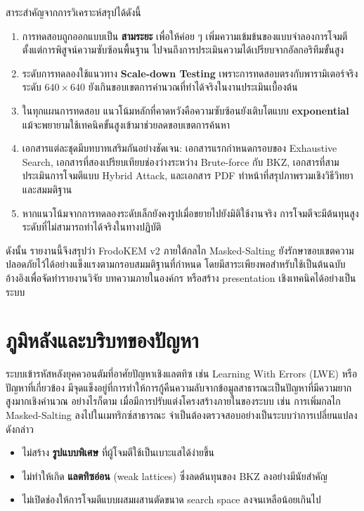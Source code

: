 \documentclass[12pt,a4paper]{article}
\newcommand{\term}[1]{\textbf{#1}}
\newcommand{\eng}[1]{\textenglish{#1}}
\begin{document}
	สาระสำคัญจากการวิเคราะห์สรุปได้ดังนี้
	\begin{enumerate}[label=\arabic*.]
		\item การทดสอบถูกออกแบบเป็น \term{สามระยะ} เพื่อให้ค่อย ๆ เพิ่มความเข้มข้นของแบบจำลองการโจมตี ตั้งแต่การพิสูจน์ความซับซ้อนพื้นฐาน ไปจนถึงการประเมินความได้เปรียบจากอัลกอริทึมขั้นสูง
		\item ระดับการทดลองใช้แนวทาง \term{Scale-down Testing} เพราะการทดสอบตรงกับพารามิเตอร์จริงระดับ $640\times640$ ยังเกินขอบเขตการคำนวณที่ทำได้จริงในงานประเมินเบื้องต้น
		\item ในทุกแผนการทดสอบ แนวโน้มหลักที่คาดหวังคือความซับซ้อนยังเติบโตแบบ \term{exponential} แม้จะพยายามใช้เทคนิคขั้นสูงเข้ามาช่วยลดขอบเขตการค้นหา
		\item เอกสารแต่ละชุดมีบทบาทเสริมกันอย่างชัดเจน: เอกสารแรกกำหนดกรอบของ \eng{Exhaustive Search}, เอกสารที่สองเปรียบเทียบช่องว่างระหว่าง \eng{Brute-force} กับ \eng{BKZ}, เอกสารที่สามประเมินการโจมตีแบบ \eng{Hybrid Attack}, และเอกสาร \eng{PDF} ทำหน้าที่สรุปภาพรวมเชิงวิธีวิทยาและสมมติฐาน
		\item หากแนวโน้มจากการทดลองระดับเล็กยังคงรูปเมื่อขยายไปยังมิติใช้งานจริง การโจมตีจะมีต้นทุนสูงระดับที่ไม่สามารถทำได้จริงในทางปฏิบัติ
	\end{enumerate}
	
	ดังนั้น รายงานนี้จึงสรุปว่า \eng{FrodoKEM v2} ภายใต้กลไก \eng{Masked-Salting} ยังรักษาขอบเขตความปลอดภัยไว้ได้อย่างแข็งแรงตามกรอบสมมติฐานที่กำหนด โดยมีสาระเพียงพอสำหรับใช้เป็นต้นฉบับอ้างอิงเพื่อจัดทำรายงานวิจัย บทความภายในองค์กร หรือสร้าง \eng{presentation} เชิงเทคนิคได้อย่างเป็นระบบ
	
	\section{ภูมิหลังและบริบทของปัญหา}
	
	ระบบเข้ารหัสหลังยุคควอนตัมที่อาศัยปัญหาเชิงแลตทิซ เช่น \eng{Learning With Errors (LWE)} หรือปัญหาที่เกี่ยวข้อง มีจุดแข็งอยู่ที่การทำให้การกู้คืนความลับจากข้อมูลสาธารณะเป็นปัญหาที่มีความยากสูงมากเชิงคำนวณ อย่างไรก็ตาม เมื่อมีการปรับแต่งโครงสร้างภายในของระบบ เช่น การเพิ่มกลไก \eng{Masked-Salting} ลงไปในเมทริกซ์สาธารณะ จำเป็นต้องตรวจสอบอย่างเป็นระบบว่าการเปลี่ยนแปลงดังกล่าว
	\begin{itemize}
		\item ไม่สร้าง \term{รูปแบบพิเศษ} ที่ผู้โจมตีใช้เป็นเบาะแสได้ง่ายขึ้น
		\item ไม่ทำให้เกิด \term{แลตทิซอ่อน} \eng{(weak lattices)} ซึ่งลดต้นทุนของ \eng{BKZ} ลงอย่างมีนัยสำคัญ
		\item ไม่เปิดช่องให้การโจมตีแบบผสมผสานตัดขนาด \eng{search space} ลงจนเหลือน้อยเกินไป
	\end{itemize}
	
\end{document}
